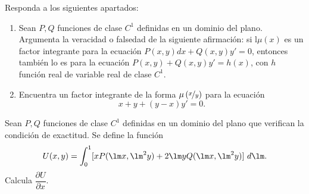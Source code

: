\documentclass[12pt]{article}
\begin{document}
\begin{ejercicio}
    Responda a los siguientes apartados:
    \begin{enumerate}
        \item Sean $P,Q$ funciones de clase $C^1$ definidas en un dominio del plano. Argumenta la veracidad o falsedad de la siguiente afirmación: si l$\mu(x)$ es un factor integrante para la ecuación $P(x,y)dx+Q(x,y)y'=0$, entonces también lo es para la ecuación $P(x,y)+Q(x,y)y'=h(x)$, con $h$ función real de variable real de clase $C^1$.
        
        \item Encuentra un factor integrante de la forma $\mu\left(\nicefrac{x}{y}\right)$ para la ecuación
        \begin{equation*}
            x+y+(y-x)y'=0.
        \end{equation*}
    \end{enumerate}
\end{ejercicio}

\begin{ejercicio}
    Sean $P,Q$ funciones de clase $C^1$ definidas en un dominio del plano que verifican la condición de exactitud. Se define la función
    \begin{equation*}
        U(x,y)=\int_{0}^{1}[xP(\lm x,\lm^2 y)+2\lm yQ(\lm x,\lm^2 y)]~d\lm.
    \end{equation*}
    Calcula $\dfrac{\partial U}{\partial x}$.
\end{ejercicio}

    
\end{document}
